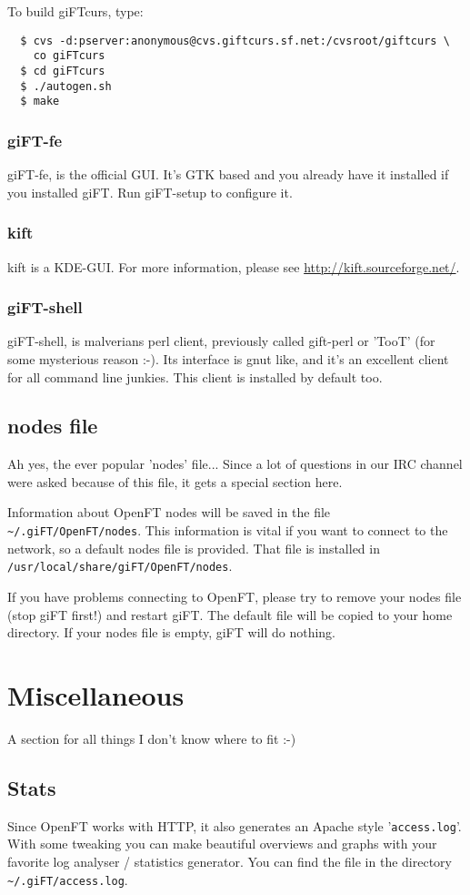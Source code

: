 \documentclass[10pt]{article}
\begin{document}
To build giFTcurs, type:

\begin{verbatim}
  $ cvs -d:pserver:anonymous@cvs.giftcurs.sf.net:/cvsroot/giftcurs \
    co giFTcurs
  $ cd giFTcurs
  $ ./autogen.sh
  $ make
\end{verbatim}

\subsubsection{giFT-fe}
giFT-fe, is the official GUI. 
It's GTK based and you already have it installed if you installed giFT.
Run giFT-setup to configure it.

\subsubsection{kift}
kift is a KDE-GUI.
For more information, please see \url{http://kift.sourceforge.net/}.

\subsubsection{giFT-shell}
giFT-shell, is malverians perl client, previously called gift-perl or 'TooT'
(for some mysterious reason :-). Its interface is gnut like, and it's an
excellent client for all command line junkies.  This client is installed by
default too.
 
\subsection{nodes file}
Ah yes, the ever popular 'nodes' file... Since a lot of questions in our IRC 
channel were asked because of this file, it gets a special section here.

Information about OpenFT nodes will be saved in the file
\texttt{\~{}/.giFT/OpenFT/nodes}. This information is vital if you want to
connect to the network, so a default nodes file is provided. That file is
installed in \texttt{/usr/local/share/giFT/OpenFT/nodes}.

If you have problems connecting to OpenFT, please try to remove your nodes file
(stop giFT first!) and restart giFT. The default file will be copied to your
home directory. If your nodes file is empty, giFT will do nothing.


\section{Miscellaneous}
A section for all things I don't know where to fit :-)

\subsection{Stats}
Since OpenFT works with HTTP, it also generates an Apache style 
'\texttt{access.log}'. 
With some tweaking you can make beautiful overviews and graphs with your 
favorite log analyser / statistics generator. 
You can find the file in the directory
\texttt{\~{}/.giFT/access.log}.
\end{document}

